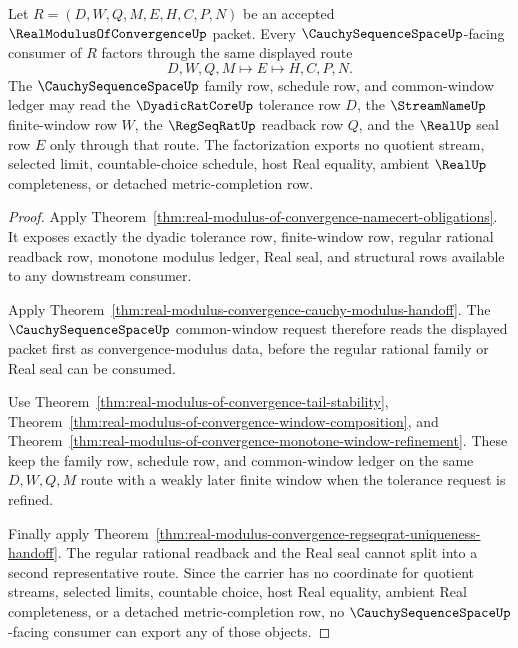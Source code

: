 \begin{theorem}\label{thm:real-modulus-convergence-cauchy-space-factorization}
Let $R=(D,W,Q,M,E,H,C,P,N)$ be an accepted $\RealModulusOfConvergenceUp$ packet. Every $\CauchySequenceSpaceUp$-facing consumer of $R$ factors through the same displayed route
$$
D,W,Q,M \longmapsto E \longmapsto H,C,P,N .
$$
The $\CauchySequenceSpaceUp$ family row, schedule row, and common-window ledger may read the $\DyadicRatCoreUp$ tolerance row $D$, the $\StreamNameUp$ finite-window row $W$, the $\RegSeqRatUp$ readback row $Q$, and the $\RealUp$ seal row $E$ only through that route. The factorization exports no quotient stream, selected limit, countable-choice schedule, host Real equality, ambient $\RealUp$ completeness, or detached metric-completion row.
\end{theorem}
\begin{proof}
Apply Theorem~\ref{thm:real-modulus-of-convergence-namecert-obligations}. It exposes exactly the dyadic tolerance row, finite-window row, regular rational readback row, monotone modulus ledger, Real seal, and structural rows available to any downstream consumer.

Apply Theorem~\ref{thm:real-modulus-convergence-cauchy-modulus-handoff}. The $\CauchySequenceSpaceUp$ common-window request therefore reads the displayed packet first as convergence-modulus data, before the regular rational family or Real seal can be consumed.

Use Theorem~\ref{thm:real-modulus-of-convergence-tail-stability}, Theorem~\ref{thm:real-modulus-of-convergence-window-composition}, and Theorem~\ref{thm:real-modulus-of-convergence-monotone-window-refinement}. These keep the family row, schedule row, and common-window ledger on the same $D,W,Q,M$ route with a weakly later finite window when the tolerance request is refined.

Finally apply Theorem~\ref{thm:real-modulus-convergence-regseqrat-uniqueness-handoff}. The regular rational readback and the Real seal cannot split into a second representative route. Since the carrier has no coordinate for quotient streams, selected limits, countable choice, host Real equality, ambient Real completeness, or a detached metric-completion row, no $\CauchySequenceSpaceUp$-facing consumer can export any of those objects.
\end{proof}



